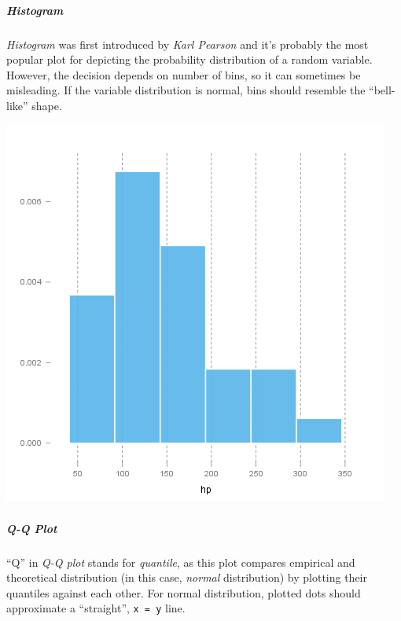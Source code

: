 \documentclass[]{article}
\makeatletter
\def\maxwidth{\ifdim\Gin@nat@width>\linewidth\linewidth
\else\Gin@nat@width\fi}
\let\Oldincludegraphics\includegraphics
\renewcommand{\includegraphics}[1]{\Oldincludegraphics[width=\maxwidth]{#1}}
\makeatother
\begin{document}
\subparagraph{Histogram}

\emph{Histogram} was first introduced by \emph{Karl Pearson} and it's
probably the most popular plot for depicting the probability
distribution of a random variable. However, the decision depends on
number of bins, so it can sometimes be misleading. If the variable
distribution is normal, bins should resemble the ``bell-like'' shape.

\href{/tmp/RtmpeIwHkw/file569da685-hires.png}{\includegraphics{78517cde85fc1ba06a3513dd17e567da.png}}

\subparagraph{Q-Q Plot}

``Q'' in \emph{Q-Q plot} stands for \emph{quantile}, as this plot
compares empirical and theoretical distribution (in this case,
\emph{normal} distribution) by plotting their quantiles against each
other. For normal distribution, plotted dots should approximate a
``straight'', \texttt{x = y} line.
\end{document}
